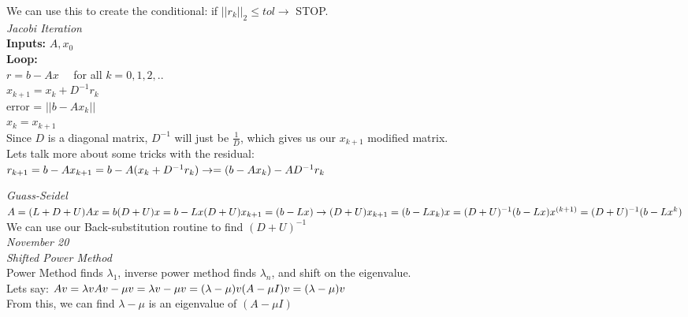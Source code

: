 \documentclass[10pt, AMS Euler]{article}
\begin{document}
We can use this to create the conditional: if $||r_k||_2 \leq tol \rightarrow$ STOP.\\

\textit{Jacobi Iteration}\\

\textbf{Inputs:} $A, x_0$\\

\textbf{Loop:}\\
$r = b - Ax \quad$ for all $k = 0,1,2,..$\\
$x_{k+1} = x_k + D^{-1} r_k$\\
error = $|| b - Ax_k||$\\
$x_k = x_{k + 1}$\\

Since $D$ is a diagonal matrix, $D^{-1}$ will just be $\frac{1}{D}$, which gives us our $x_{k+1}$ modified matrix.\\

Lets talk more about some tricks with the residual:\\
$
r_{k+1} = b - Ax_{k+1} = b - A(x_k + D^{-1}r_k)\\
\rightarrow = (b - Ax_k) - AD^{-1}r_k\\
$

\textit{Guass-Seidel}\\

$
A = (L + D + U)\\
Ax = b\\
(D + U)x = b - Lx\\
(D + U)x_{k+1} = (b - Lx)\rightarrow (D + U)x_{k + 1} = (b - Lx_k)\\
x = (D + U)^{-1} (b - Lx) \\
x^{(k + 1)} = (D + U)^{-1} (b - Lx^k)\\
$\\

We can use our Back-substitution routine to find $(D + U)^{-1}$\\

\textit{November 20}\\

\textit{Shifted Power Method}\\

Power Method finds $\lambda_1$, inverse power method finds $\lambda_n$, and shift on the eigenvalue.\\

Lets say:
$Av = \lambda v\\
Av - \mu v = \lambda v - \mu v = (\lambda - \mu) v\\
(A - \mu I) v = (\lambda - \mu) v\\
$\\
From this, we can find $\lambda - \mu$ is an eigenvalue of $(A - \mu I)$\\
\end{document}
